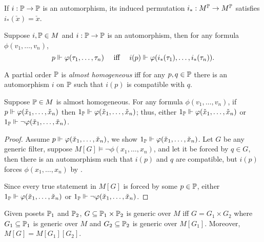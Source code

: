 \begin{observation}
    If \(i:\P\to\P\) is an automorphism, its induced permutation \(i_*: M^\P \to M^\P\) satisfies \(i_*(\check{x}) = \check{x}\).
\end{observation}

\begin{lemma} \label{lemma:forcing_invariant_under_i}
    Suppose \(i, \P\in M\) and \(i:\P\to\P\) is an automorphism, then for any formula \(\phi(v_1,\dots,v_n)\),
    \[ p\forces \phi(\tau_1,\dots,\tau_n)\quad \text{ iff }\quad i(p)\forces \phi(i_*(\tau_1),\dots,i_*(\tau_n)).  \]
\end{lemma}

\begin{definition}
    A partial order \(\P\) is \emph{almost homogeneous} iff
    for any \(p,q\in\P\) there is an automorphism \(i\) on \(\P\) such that \(i(p)\) is compatible with \(q\).
\end{definition}

\begin{proposition} \label{proposition:property_almost_homo}
    Suppose \(\P\in M\) is almost homogeneous.
    For any formula \(\phi(v_1,\dots,v_n)\),
    if \(p\forces \phi(\check{x}_1,\dots,\check{x}_n)\) then \(1_\P\forces \phi(\check{x}_1,\dots,\check{x}_n)\);
    thus, either \(1_\P\forces \phi(\check{x}_1,\dots,\check{x}_n)\) or \(1_\P\forces \lnot\phi(\check{x}_1,\dots,\check{x}_n)\).
\end{proposition}
\begin{proof}
    Assume \(p\forces \phi(\check{x}_1,\dots,\check{x}_n)\), we show \(1_\P\forces \phi(\check{x}_1,\dots,\check{x}_n)\).
    Let \(G\) be any generic filter, suppose \(M[G]\models \lnot\phi(x_1,\dots,x_n)\),
    and let it be forced by \(q\in G\), then there is an automorphism such that \(i(p)\) and \(q\) are compatible,
    but \(i(p)\) forces \(\phi(x_1,\dots,x_n)\) by .

    Since every true statement in \(M[G]\) is forced by some \(p\in\P\),
    either \(1_\P\forces \phi(\check{x}_1,\dots,\check{x}_n)\) or \(1_\P\forces \lnot\phi(\check{x}_1,\dots,\check{x}_n)\).
\end{proof}

\begin{lemma}
    \label{lemma:iterated_forcing_product}
    Given posets \(\P_1\) and \(\P_2\),
    \(G\subseteq \P_1\times\P_2\) is generic over \(M\) iff
    \(G = G_1\times G_2\) where \(G_1\subseteq \P_1\) is generic over \(M\) and \(G_2\subseteq \P_2\) is generic over \(M[G_1]\).
    Moreover, \(M[G] = M[G_1][G_2]\).
\end{lemma}

